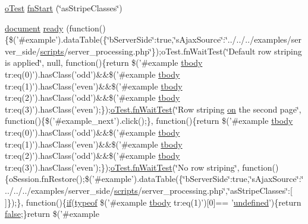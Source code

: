 \begin{DoxyCompactItemize}
\item 
\hyperlink{unit__test_8js_a3b2d259e2df3b6860d9047a92d09d0d6}{o\+Test} \hyperlink{4__server-side_2as_strip_classes_8js_a59e525c2e7e8fbf48ff8c6254d4b9152}{fn\+Start} (\char`\"{}as\+Stripe\+Classes\char`\"{})
\item 
\hyperlink{outside_events_8js_aa14f8e0338cced6720590fd2ea13bd4b}{document} \hyperlink{4__server-side_2as_strip_classes_8js_aca84a3e603c4af3f794d021455758c70}{ready} (function()\{\$('\#example').data\+Table(\{\char`\"{}b\+Server\+Side\char`\"{}\+:true,\char`\"{}s\+Ajax\+Source\char`\"{}\+:\char`\"{}../../../examples/server\+\_\+side/\hyperlink{tinymce_8jquery_8dev_8js_a09066d4d580eeec222f858d588b4cdef}{scripts}/server\+\_\+processing.\+php\char`\"{}\});o\+Test.\+fn\+Wait\+Test(\char`\"{}Default row striping is applied\char`\"{}, null, function()\{return \$('\#example \hyperlink{core_8constructor_8js_a99b0542c7c50fe8757c55bf9dac5f3be}{tbody} tr\+:eq(0)').has\+Class('odd')\&\&\$('\#example \hyperlink{core_8constructor_8js_a99b0542c7c50fe8757c55bf9dac5f3be}{tbody} tr\+:eq(1)').has\+Class('even')\&\&\$('\#example \hyperlink{core_8constructor_8js_a99b0542c7c50fe8757c55bf9dac5f3be}{tbody} tr\+:eq(2)').has\+Class('odd')\&\&\$('\#example \hyperlink{core_8constructor_8js_a99b0542c7c50fe8757c55bf9dac5f3be}{tbody} tr\+:eq(3)').has\+Class('even');\});\hyperlink{onhold_24__server-side_2__zero__config_8js_ab25c4d596771c0133cdc45178ce72c3d}{o\+Test.\+fn\+Wait\+Test}(\char`\"{}Row striping \hyperlink{fullpage_2plugin_8min_8js_a1cfa98b7fed2aaf9fee3b68dbb7f9497}{on} the second page\char`\"{}, function()\{\$('\#example\+\_\+next').click();\}, function()\{return \$('\#example \hyperlink{core_8constructor_8js_a99b0542c7c50fe8757c55bf9dac5f3be}{tbody} tr\+:eq(0)').has\+Class('odd')\&\&\$('\#example \hyperlink{core_8constructor_8js_a99b0542c7c50fe8757c55bf9dac5f3be}{tbody} tr\+:eq(1)').has\+Class('even')\&\&\$('\#example \hyperlink{core_8constructor_8js_a99b0542c7c50fe8757c55bf9dac5f3be}{tbody} tr\+:eq(2)').has\+Class('odd')\&\&\$('\#example \hyperlink{core_8constructor_8js_a99b0542c7c50fe8757c55bf9dac5f3be}{tbody} tr\+:eq(3)').has\+Class('even');\});\hyperlink{onhold_24__server-side_2__zero__config_8js_ab25c4d596771c0133cdc45178ce72c3d}{o\+Test.\+fn\+Wait\+Test}(\char`\"{}No row striping\char`\"{}, function()\{o\+Session.\+fn\+Restore();\$('\#example').data\+Table(\{\char`\"{}b\+Server\+Side\char`\"{}\+:true,\char`\"{}s\+Ajax\+Source\char`\"{}\+:\char`\"{}../../../examples/server\+\_\+side/\hyperlink{tinymce_8jquery_8dev_8js_a09066d4d580eeec222f858d588b4cdef}{scripts}/server\+\_\+processing.\+php\char`\"{},\char`\"{}as\+Stripe\+Classes\char`\"{}\+:\mbox{[}$\,$\mbox{]}\});\}, function()\{\hyperlink{fullpage_2plugin_8js_a8b98017e64ef036adb9ae327ff94abe1}{if}(\hyperlink{extras_2_scroller_2media_2docs_2media_2js_2sh_brush_j_script_8js_a93a9266f92d6d68644e7aa63da3caa11}{typeof} \$('\#example \hyperlink{core_8constructor_8js_a99b0542c7c50fe8757c55bf9dac5f3be}{tbody} tr\+:eq(1)')\mbox{[}0\mbox{]}== '\hyperlink{tinymce_8js_a08113a236cc18d2a9d5ce27e638012be}{undefined}')\{return \hyperlink{validate_8js_a5df37b7f02e5cdc7d9412b7f872b8e01}{false};\}return \$('\#example 
\end{DoxyCompactItemize}
